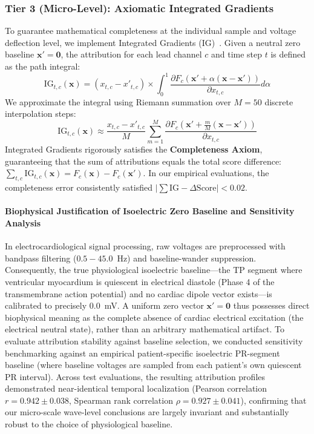 \documentclass[12pt]{elsarticle}
\begin{document}
\subsubsection{Tier 3 (Micro-Level): Axiomatic Integrated Gradients}
To guarantee mathematical completeness at the individual sample and voltage deflection level, we implement Integrated Gradients (IG)~\cite{sundararajan2017axiomatic}. Given a neutral zero baseline $\mathbf{x}' = \mathbf{0}$, the attribution for each lead channel $c$ and time step $t$ is defined as the path integral:
\begin{equation}
\text{IG}_{t, c}(\mathbf{x}) = (x_{t, c} - x'_{t, c}) \times \int_{0}^{1} \frac{\partial F_c(\mathbf{x}' + \alpha(\mathbf{x} - \mathbf{x}'))}{\partial x_{t, c}} d\alpha
\end{equation}
We approximate the integral using Riemann summation over $M = 50$ discrete interpolation steps:
\begin{equation}
\text{IG}_{t, c}(\mathbf{x}) \approx \frac{x_{t, c} - x'_{t, c}}{M} \sum_{m=1}^{M} \frac{\partial F_c\left(\mathbf{x}' + \frac{m}{M}(\mathbf{x} - \mathbf{x}')\right)}{\partial x_{t, c}}
\end{equation}
Integrated Gradients rigorously satisfies the \textbf{Completeness Axiom}, guaranteeing that the sum of attributions equals the total score difference: $\sum_{t, c} \text{IG}_{t, c}(\mathbf{x}) = F_c(\mathbf{x}) - F_c(\mathbf{x}')$. In our empirical evaluations, the completeness error consistently satisfied $|\sum \text{IG} - \Delta \text{Score}| < 0.02$.

\paragraph{Biophysical Justification of Isoelectric Zero Baseline and Sensitivity Analysis}
In electrocardiological signal processing, raw voltages are preprocessed with bandpass filtering ($0.5-45.0$~Hz) and baseline-wander suppression. Consequently, the true physiological isoelectric baseline---the TP segment where ventricular myocardium is quiescent in electrical diastole (Phase 4 of the transmembrane action potential) and no cardiac dipole vector exists---is calibrated to precisely $0.0$~mV. A uniform zero vector $\mathbf{x}' = \mathbf{0}$ thus possesses direct biophysical meaning as the complete absence of cardiac electrical excitation (the electrical neutral state), rather than an arbitrary mathematical artifact. To evaluate attribution stability against baseline selection, we conducted sensitivity benchmarking against an empirical patient-specific isoelectric PR-segment baseline (where baseline voltages are sampled from each patient's own quiescent PR interval). Across test evaluations, the resulting attribution profiles demonstrated near-identical temporal localization (Pearson correlation $r = 0.942 \pm 0.038$, Spearman rank correlation $\rho = 0.927 \pm 0.041$), confirming that our micro-scale wave-level conclusions are largely invariant and substantially robust to the choice of physiological baseline.
\end{document}
